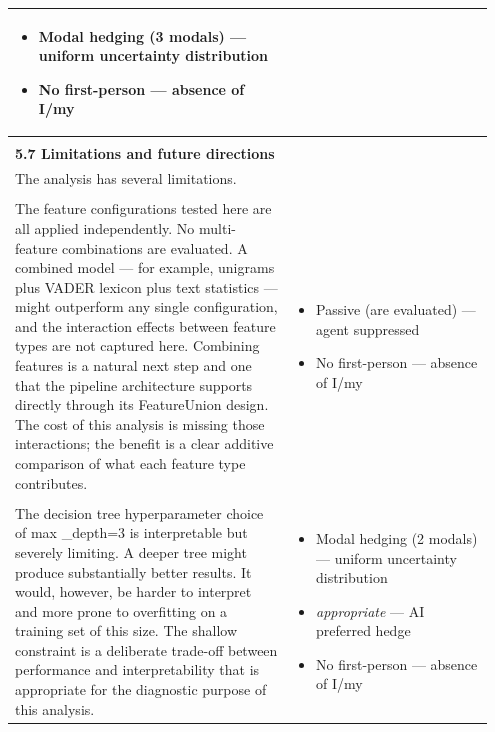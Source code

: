 \documentclass[11pt]{article}
\begin{document}
\begin{longtable}{|p{0.55\linewidth}|p{0.40\linewidth}|}
\begin{itemize}[leftmargin=1em,itemsep=1pt,topsep=1pt,parsep=0pt]
  \item Modal hedging (3 modals) --- uniform uncertainty distribution
  \item No first-person --- absence of I/my
\end{itemize} \\[2pt]
\hline
\rule[-3.5cm]{0pt}{3.5cm} & \\
\hline
\textbf{5.7 Limitations and future directions}\\[4pt]
The analysis has several limitations. &  \\[2pt]
\hline
\rule[-3.5cm]{0pt}{3.5cm} & \\
\hline
The feature configurations tested here are all applied independently. No multi-feature combinations are evaluated. A combined model --- for example, unigrams plus VADER lexicon plus text statistics --- might outperform any single configuration, and the interaction effects between feature types are not captured here. Combining features is a natural next step and one that the pipeline architecture supports directly through its FeatureUnion design. The cost of this analysis is missing those interactions; the benefit is a clear additive comparison of what each feature type contributes. & \begin{itemize}[leftmargin=1em,itemsep=1pt,topsep=1pt,parsep=0pt]
  \item Passive (are evaluated) --- agent suppressed
  \item No first-person --- absence of I/my
\end{itemize} \\[2pt]
\hline
\rule[-3.5cm]{0pt}{3.5cm} & \\
\hline
The decision tree hyperparameter choice of max \_depth=3 is interpretable but severely limiting. A deeper tree might produce substantially better results. It would, however, be harder to interpret and more prone to overfitting on a training set of this size. The shallow constraint is a deliberate trade-off between performance and interpretability that is appropriate for the diagnostic purpose of this analysis. & \begin{itemize}[leftmargin=1em,itemsep=1pt,topsep=1pt,parsep=0pt]
  \item Modal hedging (2 modals) --- uniform uncertainty distribution
  \item \textit{appropriate} --- AI preferred hedge
  \item No first-person --- absence of I/my
\end{itemize} \\[2pt]

\end{longtable}
\end{document}
